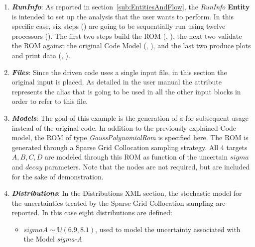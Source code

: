 \begin{enumerate}
   \item \textbf{\textit{RunInfo}}:
   As reported in section~\ref{sub:EntitiesAndFlow}, the \textit{RunInfo} \textbf{Entity} is intended to set up the analysis
   that the user wants to perform. In this specific case, six steps () are going to be sequentially run
   using twelve processors ().  The first two steps build the ROM
   (, ), the next two validate
   the ROM against the original Code Model (, ),
   and the last two produce plots and print data (, ).
   \item \textbf{\textit{Files}}:
   Since the driven code uses a single input file, in this section the original input is placed. As detailed in the user manual
   the attribute   represents the alias that is going to be used in all the other input blocks in order to refer to this file.
   \item \textbf{\textit{Models}}:
 The goal of this example is the generation of a 
 for subsequent usage instead of the original code.  In addition to the previously explained Code model,
 the ROM of type \textit{GaussPolynomialRom} is specified here. The ROM is generated through a Sparse Grid
 Collocation sampling strategy. All 4 targets $A,B,C,D$ are modeled through this ROM as function
 of the uncertain $sigma$ and $decay$ parameters.  Note that the  nodes are not
 required, but are included for the sake of demonstration.
   \item \textbf{\textit{Distributions}}:
  In the Distributions XML section, the stochastic model for the
  uncertainties  treated by the Sparse Grid Collocation sampling are reported. In
  this case eight distributions are defined:
  \begin{itemize}
    \item $sigmaA \sim \mathbb{U}(6.9,8.1)$, used to model the uncertainty
    associated with  the Model \textit{sigma-A}

\end{itemize}
\end{enumerate}
